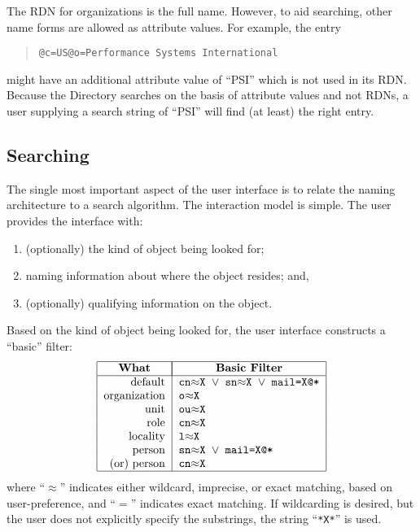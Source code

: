 The RDN for organizations is the full name.
However,
to aid searching,
other name forms are allowed as attribute values.
For example,
the entry 
\begin{quote}\small\begin{verbatim}
@c=US@o=Performance Systems International
\end{verbatim}\end{quote}
might have an additional attribute value of ``PSI'' which is not used in its
RDN.
Because the Directory searches on the basis of attribute values and not RDNs,
a user supplying a search string of ``PSI'' will find (at least) the right
entry.

\subsection	{Searching}
The single most important aspect of the user interface is to relate the naming
architecture to a search algorithm.
The interaction model is simple.
The user provides the interface with:
\begin{enumerate}
\item	(optionally) the kind of object being looked for;

\item	naming information about where the object resides;
	and,

\item	(optionally) qualifying information on the object.
\end{enumerate}
Based on the kind of object being looked for,
the user interface constructs a ``basic'' filter:
\[\begin{tabular}{|r|l|}
\hline
\multicolumn{1}{|c|}{\bf What}&
		\multicolumn{1}{|c|}{\bf Basic Filter}\\
\hline
default&	\tt cn$\approx$X $\lor$ sn$\approx$X $\lor$ mail=X@*\\
organization&	\tt o$\approx$X\\
unit&		\tt ou$\approx$X\\
role&		\tt cn$\approx$X\\
locality&	\tt l$\approx$X\\
person&		\tt sn$\approx$X $\lor$ mail=X@*\\
(or) person&	\tt cn$\approx$X\\
\hline
\end{tabular}\]
where ``$\approx$'' indicates either wildcard, imprecise, or exact matching,
based on user-preference,
and ``$=$'' indicates exact matching.
If wildcarding is desired,
but the user does not explicitly specify the substrings,
the string ``\verb"*X*"'' is used.

